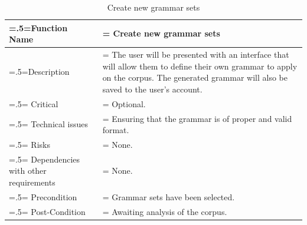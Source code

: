 \begin{center}
    \begin{table}[H]
        \caption{Create new grammar sets}
        \begin{tabularx}{\textwidth} {
                | >{\raggedright\arraybackslash\hsize=.5\hsize\linewidth=\hsize}X
                | >{\raggedright\arraybackslash\hsize=1.5\hsize\linewidth=\hsize}X |}
            \hline
            Function Name                        & Create new grammar sets                                                                                                                                                               \\ \hline
            Description                          & The user will be presented with an interface that will allow them to define their own grammar to apply on the corpus. The generated grammar will also be saved to the user's account. \\ \hline
            Critical                             & Optional.                                                                                                                                                                             \\ \hline
            Technical issues                     & Ensuring that the grammar is of proper and valid format.                                                                                                                              \\ \hline
            Risks                                & None.                                                                                                                                                                                 \\ \hline
            Dependencies with other requirements & None.                                                                                                                                                                                 \\ \hline
            Precondition                         & Grammar sets have been selected.                                                                                                                                                      \\ \hline
            Post-Condition                       & Awaiting analysis of the corpus.                                                                                                                                                      \\ \hline
        \end{tabularx}
    \end{table}
\end{center}


